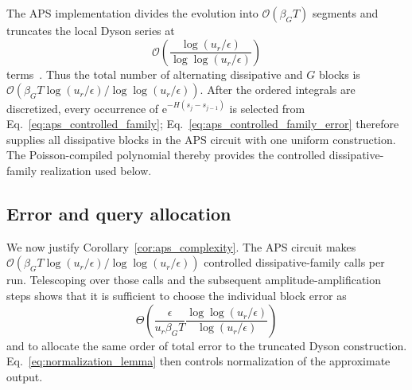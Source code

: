 \documentclass[aps,pra,reprint,floatfix,unsortedaddress,superscriptaddress]{revtex4-2}
\newcommand{\Ocal}{\mathcal{O}}
\begin{document}
The APS implementation divides the evolution into
$\Ocal(\beta_GT)$ segments and
truncates the local Dyson series at
\begin{equation}
    \Ocal\!\left(
    \frac{\log(u_r/\epsilon)}
    {\log\log(u_r/\epsilon)}
    \right)
    \label{eq:aps_local_dyson_order}
\end{equation}
terms~\cite{hu2026quantumsimulationnonunitarydynamics}.  Thus the total
number of alternating dissipative and $G$ blocks is
$\Ocal(\beta_G T\log(u_r/\epsilon)/\log\log(u_r/\epsilon))$.  After the ordered integrals are
discretized, every occurrence of
$\mathrm e^{-H(s_j-s_{j-1})}$ is selected from
Eq.~\eqref{eq:aps_controlled_family}; Eq.~\eqref{eq:aps_controlled_family_error}
therefore supplies all dissipative blocks in the APS circuit with one
uniform construction.  The Poisson-compiled polynomial thereby
provides the controlled dissipative-family realization used below.

\subsection{Error and query allocation}

We now justify Corollary~\ref{cor:aps_complexity}.  The APS circuit makes
$\Ocal(\beta_G T\log(u_r/\epsilon)/\log\log(u_r/\epsilon))$
controlled dissipative-family calls per run.  Telescoping over those
calls and the subsequent amplitude-amplification steps shows that it is
sufficient to choose the individual block error as
\begin{equation}
    \Theta\!\left(
    \frac{\epsilon}{u_r\beta_G T}
    \frac{\log\log(u_r/\epsilon)}
    {\log(u_r/\epsilon)}
    \right)
    \label{eq:aps_individual_accuracy}
\end{equation}
and to allocate the same order of total error to the truncated Dyson
construction.  Eq.~\eqref{eq:normalization_lemma} then controls
normalization of the approximate output.
\end{document}
